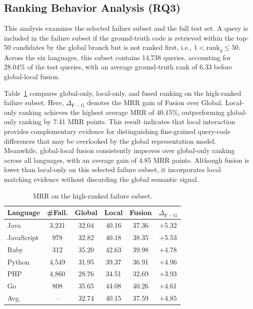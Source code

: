 \documentclass[10pt,conference]{IEEEtran}
\begin{document}
\subsection{Ranking Behavior Analysis (RQ3)}

This analysis examines the selected failure subset and the full test set. A query is included in the failure subset if the ground-truth code is retrieved within the top-50 candidates by the global branch but is not ranked first, i.e., \(1<\mathrm{rank}_g\leq50\). Across the six languages, this subset contains 14,738 queries, accounting for 28.04\% of the test queries, with an average ground-truth rank of 6.33 before global-local fusion.

Table~\ref{tab:failure_subset_mrr} compares global-only, local-only, and fused ranking on the high-ranked failure subset. 
Here, $\Delta_{\mathrm{F-G}}$ denotes the MRR gain of Fusion over Global. 
Local-only ranking achieves the highest average MRR of 40.15\%, outperforming global-only ranking by 7.41 MRR points. 
This result indicates that local interaction provides complementary evidence for distinguishing fine-grained query-code differences that may be overlooked by the global representation model. 
Meanwhile, global-local fusion consistently improves over global-only ranking across all languages, with an average gain of 4.85 MRR points. 
Although fusion is lower than local-only on this selected failure subset, it incorporates local matching evidence without discarding the global semantic signal.

\begin{table}[t]
\centering
\caption{MRR on the high-ranked failure subset.}
\label{tab:failure_subset_mrr}
\vspace{1pt}
\footnotesize
\setlength{\tabcolsep}{2.0pt}
\renewcommand{\arraystretch}{1.10}
\begin{tabular*}{\columnwidth}{@{\extracolsep{\fill}}lccccc@{}}
\toprule
Language & \#Fail. & Global & Local & Fusion & $\Delta_{\mathrm{F-G}}$ \\
\midrule
Java       & 3,231 & 32.04 & 40.16 & 37.36 & +5.32 \\
JavaScript & 978  & 32.82 & 40.18 & 38.35 & +5.53 \\
Ruby       & 312  & 35.20 & 42.63 & 39.98 & +4.78 \\
Python     & 4,549 & 31.95 & 39.37 & 36.91 & +4.96 \\
PHP        & 4,860 & 28.76 & 34.51 & 32.69 & +3.93 \\
Go         & 808  & 35.65 & 44.08 & 40.26 & +4.61 \\
\midrule
Avg.       & --   & 32.74 & 40.15 & 37.59 & +4.85 \\
\bottomrule
\end{tabular*}
\end{table}
\end{document}
